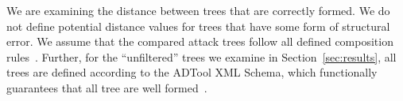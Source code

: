 We are examining the distance between trees that are correctly formed. We do not define potential distance values for trees that have some form of structural error. We assume that the compared attack trees follow all defined composition rules~\cite{mauw_foundations_2006}. Further, for the ``unfiltered'' trees we examine in Section~\ref{sec:results}, all trees are defined according to the ADTool XML Schema, which functionally guarantees that all tree are well formed~\cite{kordy_adtool_2013}.








